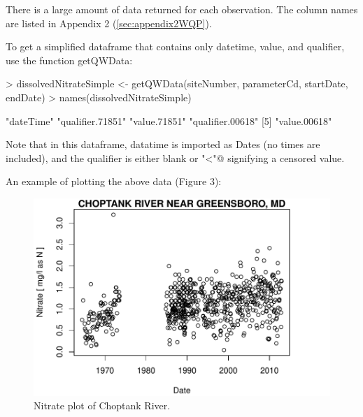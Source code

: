 \documentclass[a4paper,11pt]{article}
\begin{document}
There is a large amount of data returned for each observation. The column names are listed in Appendix 2 (\ref{sec:appendix2WQP}).

To get a simplified dataframe that contains only datetime, value, and qualifier, use the function getQWData:

\begin{Schunk}
\begin{Sinput}
> dissolvedNitrateSimple <- getQWData(siteNumber, parameterCd, 
         startDate, endDate)
> names(dissolvedNitrateSimple)
\end{Sinput}
\begin{Soutput}
[1] "dateTime"        "qualifier.71851" "value.71851"     "qualifier.00618"
[5] "value.00618"    
\end{Soutput}
\end{Schunk}
Note that in this dataframe, datatime is imported as Dates (no times are included), and the qualifier is either blank or \verb@"<"@ signifying a censored value.

An example of plotting the above data (Figure 3):

\begin{Schunk}
\end{Schunk}

\begin{figure}
\begin{center}
\includegraphics{dataRetrieval-fig3}
\end{center}
\caption{Nitrate plot of Choptank River.}
\end{figure}
\end{document}
